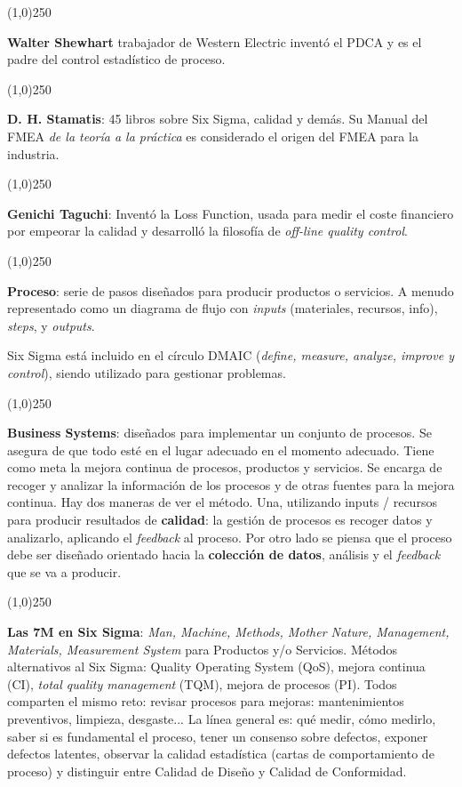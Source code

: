 \documentclass[oneside]{book}
\begin{document}
\begin{center}
	\line(1,0){250}
\end{center}
\textbf{Walter Shewhart} trabajador de Western Electric inventó el PDCA y es el padre del control estadístico de proceso. 
\begin{center}
	\line(1,0){250}
\end{center}
\textbf{D. H. Stamatis}: 45 libros sobre Six Sigma, calidad y demás. Su Manual del FMEA \textit{de la teoría a la práctica} es considerado el origen del FMEA para la industria.
\begin{center}
	\line(1,0){250}
\end{center}
\textbf{Genichi Taguchi}: Inventó la Loss Function, usada para medir el coste financiero por empeorar la calidad y desarrolló la filosofía de \textit{off-line quality control}. 
\begin{center}
	\line(1,0){250}
\end{center}
\textbf{Proceso}: serie de pasos diseñados para producir productos o servicios. A menudo representado como un diagrama de flujo con \textit{inputs} (materiales, recursos, info), \textit{steps}, y \textit{outputs}. 

Six Sigma está incluido en el círculo DMAIC (\textit{define, measure, analyze, improve y control}), siendo utilizado para gestionar problemas.
\begin{center}
	\line(1,0){250}
\end{center}
\textbf{Business Systems}: diseñados para implementar un conjunto de procesos. Se asegura de que todo esté en el lugar adecuado en el momento adecuado. Tiene como meta la mejora continua de procesos, productos y servicios. Se encarga de recoger y analizar la información de los procesos y de otras fuentes para la mejora continua. \newline
Hay dos maneras de ver el método. Una, utilizando inputs / recursos para producir resultados de \textbf{calidad}: la gestión de procesos es recoger datos y analizarlo, aplicando el \textit{feedback} al proceso. Por otro lado se piensa que el proceso debe ser diseñado orientado hacia la \textbf{colección de datos}, análisis y el \textit{feedback} que se va a producir.
\begin{center}
	\line(1,0){250}
\end{center}
\textbf{Las 7M en Six Sigma}: \textit{Man, Machine, Methods, Mother Nature, Management, Materials, Measurement System} para Productos y/o Servicios. \newline Métodos alternativos al Six Sigma: Quality Operating System (QoS), mejora continua (CI), \textit{total quality management} (TQM), mejora de procesos (PI). Todos comparten el mismo reto: revisar procesos para mejoras: mantenimientos preventivos, limpieza, desgaste... \newline La línea general es: qué medir, cómo medirlo, saber si es fundamental el proceso, tener un consenso sobre defectos, exponer defectos latentes, observar la calidad estadística (cartas de comportamiento de proceso) y distinguir entre Calidad de Diseño y Calidad de Conformidad. 
\end{document}
